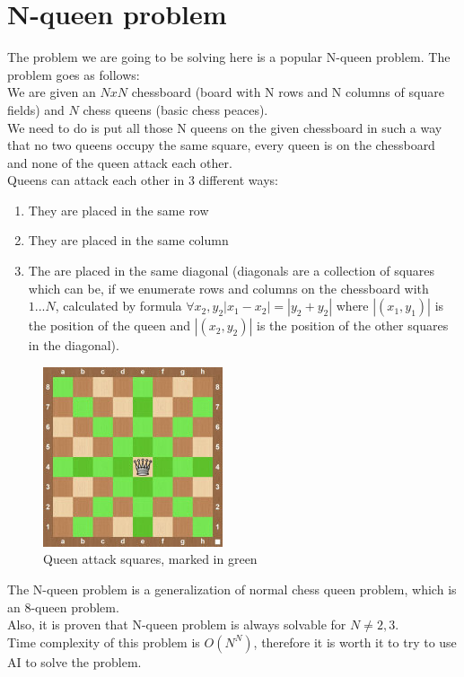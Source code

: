 \documentclass[10pt,a4paper]{article}
\begin{document}
	\section{N-queen problem}
		The problem we are going to be solving here is a popular N-queen problem. The problem goes as follows: \\
		We are given an $NxN$ chessboard (board with N rows and N columns of square fields) and $N$ chess queens (basic chess peaces).\\
		We need to do is put all those N queens on the given chessboard in such a way that no two queens occupy the same square, every queen is on the chessboard and none of the queen attack each other. \\
		Queens can attack each other in 3 different ways:
		\begin{enumerate}
			\item They are placed in the same row
			\item They are placed in the same column
			\item The are placed in the same diagonal (diagonals are a collection of squares which can be, if we enumerate rows and columns on the chessboard with $1...N$, calculated by formula $\forall x_2,y_2 |x_1-x_2|=|y_2+y_2|$ where $|(x_1,y_1)|$ is the position of the queen and $|(x_2,y_2)|$ is the position of the other squares in the diagonal).
		\end{enumerate}
		\begin{figure}[h]
                        \caption{Queen attack squares, marked in green}
                        \includegraphics{queen_attack.jpg}
                        \centering
                \end{figure}
		The N-queen problem is a generalization of normal chess queen problem, which is an 8-queen problem. \\
		Also, it is proven that N-queen problem is always solvable for $N\neq2,3$. \\
		Time complexity of this problem is $O(N^{N})$, therefore it is worth it to try to use AI to solve the problem.
	\pagebreak
\end{document}
